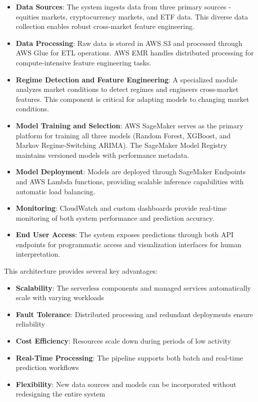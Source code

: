 \documentclass[conference]{IEEEtran}
\begin{document}
\begin{itemize}
    \item \textbf{Data Sources}: The system ingests data from three primary sources - equities markets, cryptocurrency markets, and ETF data. This diverse data collection enables robust cross-market feature engineering.
    
    \item \textbf{Data Processing}: Raw data is stored in AWS S3 and processed through AWS Glue for ETL operations. AWS EMR handles distributed processing for compute-intensive feature engineering tasks.
    
    \item \textbf{Regime Detection and Feature Engineering}: A specialized module analyzes market conditions to detect regimes and engineers cross-market features. This component is critical for adapting models to changing market conditions.
    
    \item \textbf{Model Training and Selection}: AWS SageMaker serves as the primary platform for training all three models (Random Forest, XGBoost, and Markov Regime-Switching ARIMA). The SageMaker Model Registry maintains versioned models with performance metadata.
    
    \item \textbf{Model Deployment}: Models are deployed through SageMaker Endpoints and AWS Lambda functions, providing scalable inference capabilities with automatic load balancing.
    
    \item \textbf{Monitoring}: CloudWatch and custom dashboards provide real-time monitoring of both system performance and prediction accuracy.
    
    \item \textbf{End User Access}: The system exposes predictions through both API endpoints for programmatic access and visualization interfaces for human interpretation.
\end{itemize}

This architecture provides several key advantages:
\begin{itemize}
    \item \textbf{Scalability}: The serverless components and managed services automatically scale with varying workloads
    \item \textbf{Fault Tolerance}: Distributed processing and redundant deployments ensure reliability
    \item \textbf{Cost Efficiency}: Resources scale down during periods of low activity
    \item \textbf{Real-Time Processing}: The pipeline supports both batch and real-time prediction workflows
    \item \textbf{Flexibility}: New data sources and models can be incorporated without redesigning the entire system
\end{itemize}
\end{document}
